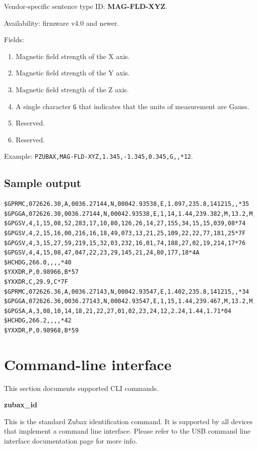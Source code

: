 \documentclass{zubaxdoc}
\begin{document}
Vendor-specific sentence type ID: \textbf{MAG-FLD-XYZ}.

Availability: firmware v4.0 and newer.

Fields:

\begin{enumerate}
\item Magnetic field strength of the X axis.
\item Magnetic field strength of the Y axis.
\item Magnetic field strength of the Z axis.
\item A single character \texttt{G} that indicates that the units of measurement are Gauss.
\item Reserved.
\item Reserved.
\end{enumerate}

Example: \verb|PZUBAX,MAG-FLD-XYZ,1.345,-1.345,0.345,G,,*12|.

\subsection{Sample output}

\begin{verbatim}
$GPRMC,072626.30,A,0036.27144,N,00042.93538,E,1.097,235.8,141215,,*35
$GPGGA,072626.30,0036.27144,N,00042.93538,E,1,14,1.44,239.382,M,13.2,M,,*5E
$GPGSV,4,1,15,08,52,283,17,10,80,126,26,14,27,155,34,15,15,039,08*74
$GPGSV,4,2,15,16,00,216,16,18,49,073,13,21,25,109,22,22,77,181,25*7F
$GPGSV,4,3,15,27,59,219,15,32,03,232,16,01,74,188,27,02,19,214,17*76
$GPGSV,4,4,15,08,47,047,22,23,29,145,21,24,80,177,18*4A
$HCHDG,266.0,,,,*40
$YXXDR,P,0.98966,B*57
$YXXDR,C,29.9,C*7F
$GPRMC,072626.36,A,0036.27143,N,00042.93547,E,1.402,235.8,141215,,*34
$GPGGA,072626.36,0036.27143,N,00042.93547,E,1,15,1.44,239.467,M,13.2,M,,*5A
$GPGSA,A,3,08,10,14,18,21,22,27,01,02,23,24,12,2.24,1.44,1.71*04
$HCHDG,266.2,,,,*42
$YXXDR,P,0.98968,B*59
\end{verbatim}
\clearpage

\section{Command-line interface}

This section documents supported CLI commands.

\textbf{zubax{\_}id}

This is the standard Zubax identification command. It is supported by all devices that implement a command line interface. Please refer to the USB command line interface documentation page for more info.
\end{document}
